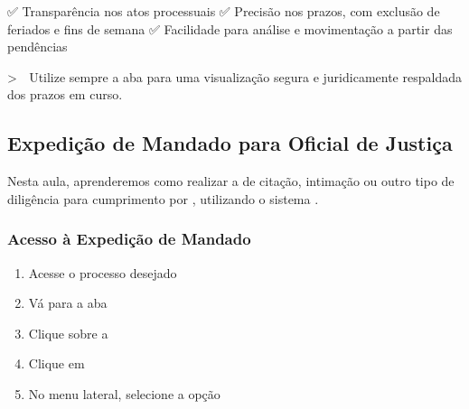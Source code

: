 \documentclass[letterpaper,10pt,brazil]{sphinxmanual}
\begin{document}
\sphinxAtStartPar
✅ Transparência nos atos processuais
✅ Precisão nos prazos, com exclusão de feriados e fins de semana
✅ Facilidade para análise e movimentação a partir das pendências

\sphinxAtStartPar
\textgreater{} 📌 Utilize sempre a aba  para uma visualização segura e juridicamente respaldada dos prazos em curso.

\sphinxstepscope


\subsection{Expedição de Mandado para Oficial de Justiça}
\label{\detokenize{projud_32_expedicaomandado:expedicao-de-mandado-para-oficial-de-justica}}\label{\detokenize{projud_32_expedicaomandado::doc}}
\sphinxAtStartPar
Nesta aula, aprenderemos como realizar a  de citação, intimação ou outro tipo de diligência para cumprimento por , utilizando o sistema .


\subsubsection{Acesso à Expedição de Mandado}
\label{\detokenize{projud_32_expedicaomandado:acesso-a-expedicao-de-mandado}}\begin{enumerate}
%
\item {} 
\sphinxAtStartPar
Acesse o processo desejado

\item {} 
\sphinxAtStartPar
Vá para a aba 

\item {} 
\sphinxAtStartPar
Clique sobre a 

\item {} 
\sphinxAtStartPar
Clique em 

\item {} 
\sphinxAtStartPar
No menu lateral, selecione a opção 

\end{enumerate}
\end{document}
